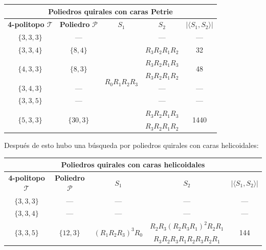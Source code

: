 \documentclass[spanish]{article}
\theoremstyle{definition}
\newcommand{\p}{\mathcal{P}}
\newcommand{\T}{\mathcal{T}}
\begin{document}
	\begin{center}
		\begin{tabular}{|c |c| c| c|c|}
			\hline
			\multicolumn{5}{|c|}{\textbf{Poliedros quirales con caras Petrie}}\\
			\hline\textbf{4-politopo $\T$} & \textbf{Poliedro} $\p$ &$S_1$&$S_2$&$|\langle S_1,S_2\rangle|$\\\hline\hline
			$\{3,3,3\}$&—&\multirow{8}{*}{$R_0R_1R_2R_3$}&—&—\\		\cline{1-2}\cline{4-5}
			$\{3,3,4\}$&$\{8,4\}$&&$R_3R_2R_1R_2$&32\\\cline{1-2}	\cline{4-5}
			\multirow{2}{*}{$\{4,3,3\}$}&\multirow{2}{*}{$\{8,3\}$}&&$R_3R_2R_1R_3$&\multirow{2}{*}{48}\\
			&&&$R_3R_2R_1R_2$&\\\cline{1-2}	\cline{4-5}
			$\{3,4,3\}$&—&&—&—\\\cline{1-2}	\cline{4-5}
			$\{3,3,5\}$&—&&—&—\\\cline{1-2}	\cline{4-5}
			\multirow{2}{*}{$\{5,3,3\}$}&\multirow{2}{*}{$\{30,3\}$}&&$R_3R_2R_1R_3$&\multirow{2}{*}{1440}\\
			&&&$R_3R_2R_1R_2$&\\\hline
		\end{tabular}
	\end{center}
	
	Después de esto hubo una búsqueda por poliedros quirales con caras helicoidales:
	
	\begin{center}
		\begin{tabular}{|c |c| c| c|c|}
			\hline
			\multicolumn{5}{|c|}{\textbf{Poliedros quirales con caras helicoidales}}\\
			\hline\textbf{4-politopo $\T$} & \textbf{Poliedro} $\p$ &$S_1$&$S_2$&$|\langle S_1,S_2\rangle|$\\\hline\hline
			$\{3,3,3\}$&—&—&—&—\\\hline
			$\{3,3,4\}$&—&—&—&—\\\hline
			\multirow{2}{*}{$\{3,3,5\}$}&\multirow{2}{*}{$\{12,3\}$}&\multirow{2}{*}{$(R_1R_2R_3)^3R_0$}&$R_2R_3(R_2R_3R_1)^2R_2R_1$&\multirow{2}{*}{144}\\
			&&&$R_3R_2R_3R_1R_2R_3R_2R_1$&\\
			\hline
		\end{tabular}
	\end{center}
\end{document}
